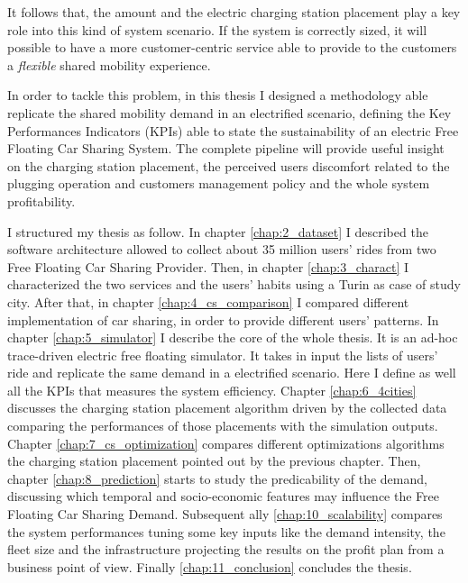 It follows that, the amount and the electric charging station placement play a key role into this kind of system scenario. If the system is correctly sized, it will possible to have a more customer-centric service able to provide to the customers  a \textit{flexible} shared mobility experience.

In order to tackle this problem, in this thesis I designed a methodology able replicate the shared mobility demand in an electrified scenario, defining the Key Performances Indicators (KPIs) able to state the sustainability of an electric Free Floating Car Sharing System. The complete pipeline will provide useful insight on the charging station placement, the perceived users discomfort related to the plugging operation and customers management policy and the whole system profitability.


I structured my thesis as follow. In chapter \ref{chap:2_dataset} I described the software architecture allowed to collect about 35 million users' rides from two Free Floating Car Sharing Provider. Then, in chapter \ref{chap:3_charact} I characterized the two services and the users' habits using a Turin as case of study city. After that, in chapter \ref{chap:4_cs_comparison} I compared different implementation of car sharing, in order to provide different users' patterns. In chapter \ref{chap:5_simulator} I describe the core of the whole thesis. It is an ad-hoc trace-driven electric free floating simulator. It takes in input the lists of users' ride and replicate the same demand in a electrified scenario. Here I define as well all the KPIs that measures the system efficiency. Chapter \ref{chap:6_4cities} discusses the charging station placement algorithm driven by the collected data comparing the performances of those placements with the simulation outputs. Chapter \ref{chap:7_cs_optimization} compares different optimizations algorithms the charging station placement pointed out by the previous chapter. Then, chapter \ref{chap:8_prediction} starts to study the predicability of the demand, discussing which temporal and socio-economic features may influence the Free Floating Car Sharing Demand. Subsequent ally \ref{chap:10_scalability} compares the system performances tuning some key inputs like the demand intensity, the fleet size and the infrastructure projecting the results on the profit plan from a business point of view. Finally \ref{chap:11_conclusion} concludes the thesis.













